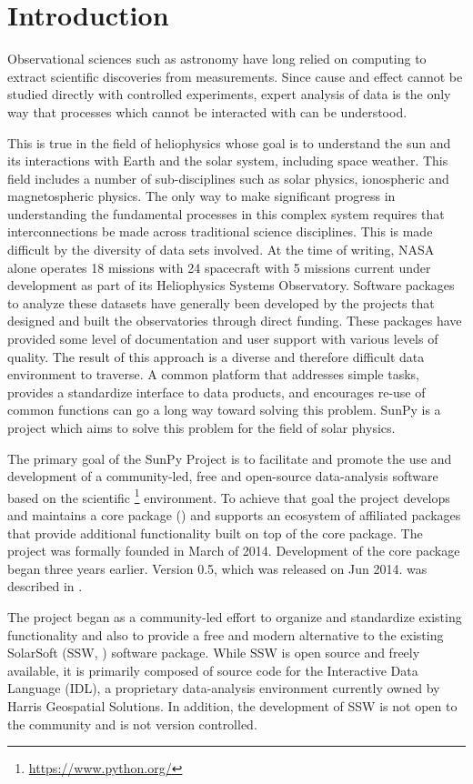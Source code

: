 \section{Introduction}
Observational sciences such as astronomy have long relied on computing
to extract scientific discoveries from measurements. Since
cause and effect cannot be studied directly with controlled experiments, expert analysis
of data is the only way that processes which cannot be interacted with can be
understood. 

This is true in the field of heliophysics whose goal is to understand the sun and its interactions with Earth and the solar system, including space weather. This field includes a number of sub-disciplines such as solar physics, ionospheric and magnetospheric physics. The only way to make significant progress in understanding the fundamental processes in this complex system requires that interconnections be made across traditional science disciplines. This is made difficult by the diversity of data sets involved. At the time of writing, NASA alone operates 18 missions with 24 spacecraft with 5 missions current under development as part of its Heliophysics Systems Observatory.  Software packages to analyze these datasets have generally been developed by the projects that designed and built the observatories through direct funding. These packages have provided some level of documentation and user support with various levels of quality. The result of this approach is a diverse and therefore difficult data environment to traverse. A common platform that addresses simple tasks, provides a standardize interface to data products, and encourages re-use of common functions can go a long way toward solving this problem. SunPy is a project which aims to solve this problem for the field of solar physics. 

The primary goal of the SunPy Project is to facilitate and promote the use and development of a community-led, free and open-source data-analysis software based on the scientific \python\footnote{\url{https://www.python.org/}} environment. To achieve that goal the project develops and maintains a core package (\sunpypkg) and supports an ecosystem of affiliated packages that provide additional functionality built on top of the core package. The project was formally founded in March of 2014. Development of the core package began three years earlier. Version 0.5, which was released on Jun 2014. was described in \citep{Community:2015cy}.

The project began as a community-led effort to organize and standardize existing functionality and also to provide a free and modern alternative to the existing SolarSoft (SSW, \citet{Freeland:1998we}) software package. While SSW is open source and freely available, it is primarily composed of source code for the Interactive Data Language (IDL), a proprietary data-analysis environment currently owned by Harris Geospatial Solutions. In addition, the development of SSW is not open to the community and is not version controlled.

